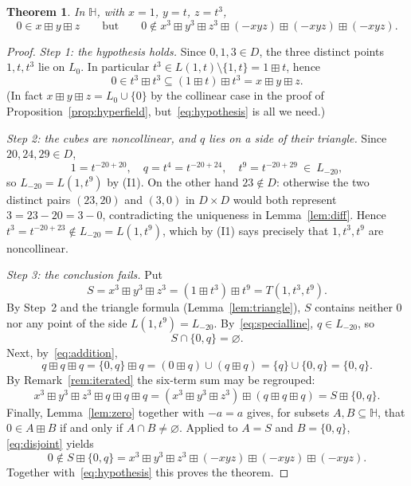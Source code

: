 \documentclass[12pt]{article}
\theoremstyle{plain}
\newtheorem{theorem}{Theorem}[section]
\theoremstyle{definition}
\newcommand{\Hh}{\mathbb{H}}
\newcommand{\bp}{\boxplus}
\begin{document}
\begin{theorem}\label{thm:counterexample}
In $\Hh$, with $x=1$, $y=t$, $z=t^3$,
\[
 0\in x\bp y\bp z
 \qquad\text{but}\qquad
 0\notin x^3\bp y^3\bp z^3\bp(-xyz)\bp(-xyz)\bp(-xyz).
\]
\end{theorem}
\begin{proof}
\emph{Step 1: the hypothesis holds.}  Since $0,1,3\in D$, the three
distinct points $1,t,t^3$ lie on $L_0$.  In particular
$t^3\in L(1,t)\setminus\{1,t\}=1\bp t$, hence
\begin{equation}\label{eq:hypothesis}
 0\in t^3\bp t^3\subseteq(1\bp t)\bp t^3=x\bp y\bp z .
\end{equation}
(In fact $x\bp y\bp z=L_0\cup\{0\}$ by the collinear case in the proof
of Proposition~\ref{prop:hyperfield}, but~\eqref{eq:hypothesis} is all
we need.)

\emph{Step 2: the cubes are noncollinear, and $q$ lies on a side of
their triangle.}  Since $20,24,29\in D$,
\begin{equation}\label{eq:specialline}
 1=t^{-20+20},\quad q=t^4=t^{-20+24},\quad t^9=t^{-20+29}\ \in\ L_{-20},
\end{equation}
so $L_{-20}=L(1,t^9)$ by (I1).  On the other hand $23\notin D$:
otherwise the two distinct pairs $(23,20)$ and $(3,0)$ in $D\times D$
would both represent $3=23-20=3-0$, contradicting the uniqueness in
Lemma~\ref{lem:diff}.  Hence $t^3=t^{-20+23}\notin L_{-20}=L(1,t^9)$,
which by (I1) says precisely that $1,t^3,t^9$ are noncollinear.

\emph{Step 3: the conclusion fails.}  Put
\[
 S=x^3\bp y^3\bp z^3=(1\bp t^3)\bp t^9=T(1,t^3,t^9).
\]
By Step~2 and the triangle formula (Lemma~\ref{lem:triangle}), $S$
contains neither $0$ nor any point of the side $L(1,t^9)=L_{-20}$.
By~\eqref{eq:specialline}, $q\in L_{-20}$, so
\begin{equation}\label{eq:disjoint}
 S\cap\{0,q\}=\varnothing .
\end{equation}
Next, by~\eqref{eq:addition},
\[
 q\bp q\bp q=\{0,q\}\bp q=(0\bp q)\cup(q\bp q)=\{q\}\cup\{0,q\}=\{0,q\}.
\]
By Remark~\ref{rem:iterated} the six-term sum may be regrouped:
\[
 x^3\bp y^3\bp z^3\bp q\bp q\bp q
 =(x^3\bp y^3\bp z^3)\bp(q\bp q\bp q)=S\bp\{0,q\}.
\]
Finally, Lemma~\ref{lem:zero} together with $-a=a$ gives, for subsets
$A,B\subseteq\Hh$, that $0\in A\bp B$ if and only if
$A\cap B\neq\varnothing$.  Applied to $A=S$ and $B=\{0,q\}$,
\eqref{eq:disjoint} yields
\[
 0\notin S\bp\{0,q\}
 =x^3\bp y^3\bp z^3\bp(-xyz)\bp(-xyz)\bp(-xyz).
\]
Together with~\eqref{eq:hypothesis} this proves the theorem.
\end{proof}
\end{document}
